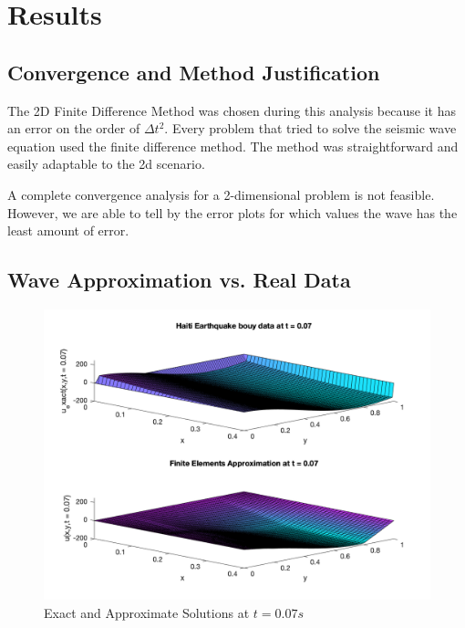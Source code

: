 \documentclass[conf]{new-aiaa}
\begin{document}
\section{Results}
\subsection{Convergence and Method Justification}
The 2D Finite Difference Method was chosen during this analysis because it has an error on the order of $\Delta t^2$. Every problem that tried to solve the seismic wave equation used the finite difference method. The method was straightforward and easily adaptable to the 2d scenario. 

A complete convergence analysis for a 2-dimensional problem is not feasible. However, we are able to tell by the error plots for which values the wave has the least amount of error. 

\subsection{Wave Approximation vs. Real Data}

\begin{figure}[H]
    \begin{center}
    \includegraphics [width= 1\linewidth]{figures/ExactandApprox_t007.png}
    \caption{Exact and Approximate Solutions at $t=0.07s$}
    \label{fig_t007}
    \end{center}
\end{figure}
\end{document}
